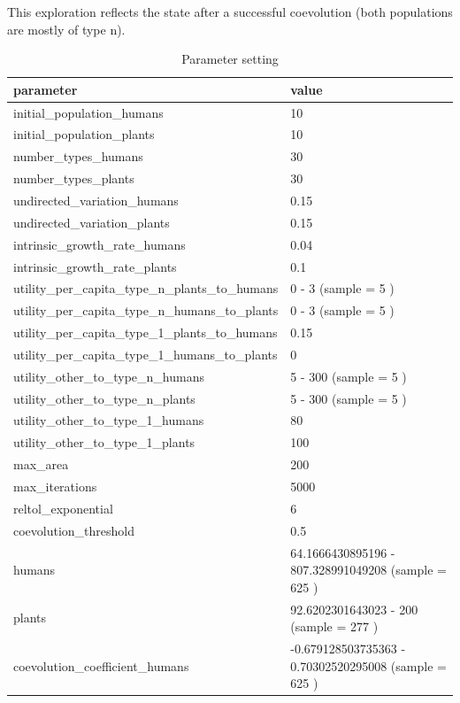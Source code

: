 \documentclass[
]{book}
\begin{document}

This exploration reflects the state after a successful coevolution (both populations are mostly of type n).

\begin{table}[!h]

\caption{\label{tab:4UbnmUntablepdf}Parameter setting}
\centering
\begin{tabular}[t]{l|l}
\hline
parameter & value\\
\hline
initial\_population\_humans & 10\\
\hline
initial\_population\_plants & 10\\
\hline
number\_types\_humans & 30\\
\hline
number\_types\_plants & 30\\
\hline
undirected\_variation\_humans & 0.15\\
\hline
undirected\_variation\_plants & 0.15\\
\hline
intrinsic\_growth\_rate\_humans & 0.04\\
\hline
intrinsic\_growth\_rate\_plants & 0.1\\
\hline
utility\_per\_capita\_type\_n\_plants\_to\_humans & 0 - 3 (sample = 5 )\\
\hline
utility\_per\_capita\_type\_n\_humans\_to\_plants & 0 - 3 (sample = 5 )\\
\hline
utility\_per\_capita\_type\_1\_plants\_to\_humans & 0.15\\
\hline
utility\_per\_capita\_type\_1\_humans\_to\_plants & 0\\
\hline
utility\_other\_to\_type\_n\_humans & 5 - 300 (sample = 5 )\\
\hline
utility\_other\_to\_type\_n\_plants & 5 - 300 (sample = 5 )\\
\hline
utility\_other\_to\_type\_1\_humans & 80\\
\hline
utility\_other\_to\_type\_1\_plants & 100\\
\hline
max\_area & 200\\
\hline
max\_iterations & 5000\\
\hline
reltol\_exponential & 6\\
\hline
coevolution\_threshold & 0.5\\
\hline
humans & 64.1666430895196 - 807.328991049208 (sample = 625 )\\
\hline
plants & 92.6202301643023 - 200 (sample = 277 )\\
\hline
coevolution\_coefficient\_humans & -0.679128503735363 - 0.70302520295008 (sample = 625 )\\

\end{tabular}
\end{table}
\end{document}
